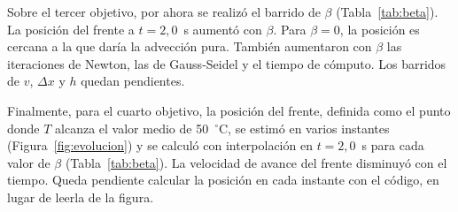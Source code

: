 \documentclass[final,5p,times,twocolumn,authoryear,11pt]{elsarticle}
\begin{document}
Sobre el tercer objetivo, por ahora se realizó el barrido de $\beta$
(Tabla~\ref{tab:beta}). La posición del frente a $t=2{,}0$~s aumentó con $\beta$. Para
$\beta=0$, la posición es cercana a la que daría la advección pura. También aumentaron con $\beta$ las iteraciones de Newton, las de Gauss-Seidel y el tiempo de cómputo. Los barridos de
$v$, $\Delta x$ y $h$ quedan pendientes.

Finalmente, para el cuarto objetivo, la posición del frente, definida como el
punto donde $T$ alcanza el valor medio de 50~$^\circ$C, se estimó en varios instantes (Figura~\ref{fig:evolucion}) y se
calculó con interpolación en $t=2{,}0$~s para cada valor de $\beta$
(Tabla~\ref{tab:beta}). La velocidad de avance del frente disminuyó con el tiempo. Queda pendiente calcular la posición en cada instante con el código, en lugar de leerla de la figura.

\end{document}
